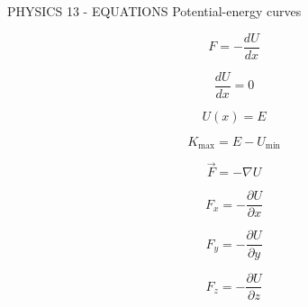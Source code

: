 PHYSICS 13 - EQUATIONS
Potential-energy curves

$$F = -\frac{dU}{dx}$$

$$\frac{dU}{dx} = 0$$

$$U(x) = E$$

$$K_{\max} = E - U_{\min}$$


$$\vec F=-\nabla U$$

$$F_x=-\frac{\partial U}{\partial x}$$

$$F_y=-\frac{\partial U}{\partial y}$$

$$F_z=-\frac{\partial U}{\partial z}$$
